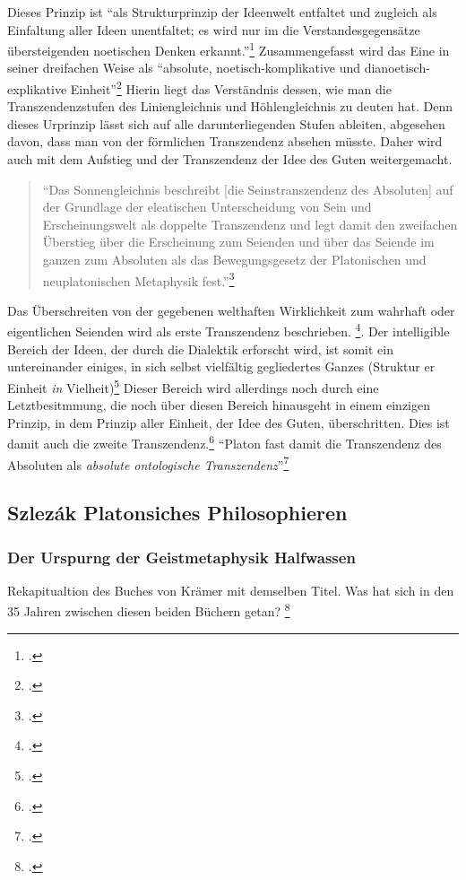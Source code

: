\documentclass[12pt]{article}
\newcommand*{\zitatblock}[1]{%
    \begin{quote}
    \fontsize{10}{12}\selectfont
    \setlength{\parskip}{1.0em}
    #1
    \end{quote}
}
\begin{document}
Dieses Prinzip ist \enquote{als Strukturprinzip der Ideenwelt entfaltet und zugleich als Einfaltung aller Ideen unentfaltet; es wird nur im die Verstandesgegensätze übersteigenden noetischen Denken erkannt.}\footcite[vgl.][S. 190]{halfwassenaufstieg2006}
Zusammengefasst wird das Eine in seiner dreifachen Weise als \enquote{absolute, noetisch-komplikative und dianoetisch-explikative Einheit}\footcite[][S. 190]{halfwassenaufstieg2006}
Hierin liegt das Verständnis dessen, wie man die Transzendenzstufen des Liniengleichnis und Höhlengleichnis zu deuten hat. Denn dieses Urprinzip lässt sich auf alle darunterliegenden Stufen ableiten, abgesehen davon, dass man von der förmlichen Transzendenz absehen müsste. 
Daher wird auch mit dem Aufstieg und der Transzendenz der Idee des Guten weitergemacht.
\zitatblock{\enquote{Das Sonnengleichnis beschreibt [die Seinstranszendenz des Absoluten] auf der Grundlage der eleatischen Unterscheidung von Sein und Erscheinungswelt als doppelte Transzendenz und legt damit den zweifachen Überstieg über die Erscheinung zum Seienden und über das Seiende im ganzen zum Absoluten als das Bewegungsgesetz der Platonischen und neuplatonischen Metaphysik fest.}\footcite[vgl.][S. 222]{halfwassenaufstieg2006}}
Das Überschreiten von der gegebenen welthaften Wirklichkeit zum wahrhaft oder eigentlichen Seienden wird als erste Transzendenz beschrieben. \footcite[vgl.][S. 222]{halfwassenaufstieg2006}.
Der intelligible Bereich der Ideen, der durch die Dialektik erforscht wird, ist somit ein untereinander einiges, in sich selbst vielfältig gegliedertes Ganzes (Struktur er Einheit \emph{in} Vielheit)\footcite[vgl.][S. 223]{halfwassenaufstieg2006} Dieser Bereich wird allerdings noch durch eine Letztbesitmmung, die noch über diesen Bereich hinausgeht in einem einzigen Prinzip, in dem Prinzip aller Einheit, der Idee des Guten, überschritten. Dies ist damit auch die zweite Transzendenz.\footcite[vgl.][S. 223f.]{halfwassenaufstieg2006}
\enquote{Platon fast damit die Transzendenz des Absoluten als \emph{absolute ontologische Transzendenz}}\footcite[][S. 224]{halfwassenaufstieg2006}
\subsection*{Szlezák Platonsiches Philosophieren}
\subsubsection*{Der Urspurng der Geistmetaphysik Halfwassen}
Rekapitualtion des Buches von Krämer mit demselben Titel. Was hat sich in den 35 Jahren zwischen diesen beiden Büchern getan? \footcite[vgl.][S. 50]{HalfwassenGeistmetaphysik}
\end{document}
